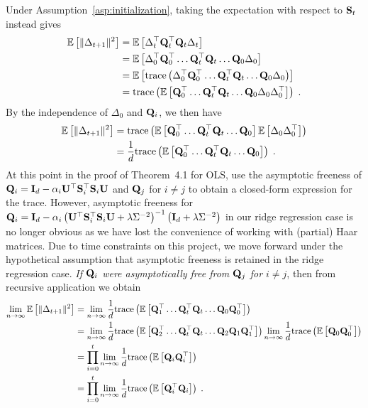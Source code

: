 Under Assumption~\ref{asp:initialization}, taking the expectation with respect to $\mathbf{S}_t$ instead gives
\begin{align*}
\mathbb{E}\left[\|\Delta_{t+1}\|^2\right] &= \mathbb{E}\left[\Delta_t^\top\mathbf{Q}_t^\top\mathbf{Q}_t\Delta_t\right] \\
&= \mathbb{E}\left[\Delta_0^\top\mathbf{Q}_0^\top\ldots \mathbf{Q}_t^\top\mathbf{Q}_t\ldots\mathbf{Q}_0\Delta_0\right] \\
&= \mathbb{E}\left[\mathrm{trace}\left(\Delta_0^\top\mathbf{Q}_0^\top\ldots \mathbf{Q}_t^\top\mathbf{Q}_t\ldots\mathbf{Q}_0\Delta_0\right)\right] \\
&= \mathrm{trace}\left(\mathbb{E}\left[\mathbf{Q}_0^\top\ldots \mathbf{Q}_t^\top\mathbf{Q}_t\ldots\mathbf{Q}_0\Delta_0\Delta_0^\top\right]\right) \;.
\end{align*}
By the independence of $\Delta_0$ and $\mathbf{Q}_i$, we then have
\begin{align*}
\mathbb{E}\left[\|\Delta_{t+1}\|^2\right] &= \mathrm{trace}\left(\mathbb{E}\left[\mathbf{Q}_0^\top\ldots \mathbf{Q}_t^\top\mathbf{Q}_t\ldots\mathbf{Q}_0\right]\mathbb{E}\left[\Delta_0\Delta_0^\top\right]\right) \\
&= \frac{1}{d}\mathrm{trace}\left(\mathbb{E}\left[\mathbf{Q}_0^\top\ldots \mathbf{Q}_t^\top\mathbf{Q}_t\ldots\mathbf{Q}_0\right]\right) \;.
\end{align*}
At this point in the proof of Theorem~4.1 for OLS, \citet{Lacotte:2020} use the asymptotic freeness of $\mathbf{Q}_i=\mathbf{I}_d-\alpha_i\mathbf{U}^\top\mathbf{S}_i^\top\mathbf{S}_i\mathbf{U}$ and $\mathbf{Q}_j$ for $i\neq j$ to obtain a closed-form expression for the trace. However, asymptotic freeness for $\mathbf{Q}_i=\mathbf{I}_d - \alpha_i\left(\mathbf{U}^\top\mathbf{S}_i^\top\mathbf{S}_i\mathbf{U} + \lambda\Sigma^{-2}\right)^{-1}\left(\mathbf{I}_d + \lambda\Sigma^{-2}\right)$ in our ridge regression case is no longer obvious as we have lost the convenience of working with (partial) Haar matrices. Due to time constraints on this project, we move forward under the hypothetical assumption that asymptotic freeness is retained in the ridge regression case. \textit{If $\mathbf{Q}_i$ were asymptotically free from $\mathbf{Q}_j$ for $i\neq j$}, then from recursive application we obtain
\begin{align*}
\lim_{n\rightarrow\infty}\mathbb{E}\left[\|\Delta_{t+1}\|^2\right] &= \lim_{n\rightarrow\infty}\frac{1}{d}\mathrm{trace}\left(\mathbb{E}\left[\mathbf{Q}_1^\top\ldots \mathbf{Q}_t^\top\mathbf{Q}_t\ldots\mathbf{Q}_0\mathbf{Q}_0^\top\right]\right) \\
&= \lim_{n\rightarrow\infty}\frac{1}{d}\mathrm{trace}\left(\mathbb{E}\left[\mathbf{Q}_2^\top\ldots \mathbf{Q}_t^\top\mathbf{Q}_t\ldots\mathbf{Q}_2\mathbf{Q}_1\mathbf{Q}_1^\top\right]\right)\lim_{n\rightarrow\infty}\frac{1}{d}\mathrm{trace}\left(\mathbb{E}\left[\mathbf{Q}_0\mathbf{Q}_0^\top\right]\right) \\
&= \prod_{i=0}^t\lim_{n\rightarrow\infty}\frac{1}{d}\mathrm{trace}\left(\mathbb{E}\left[\mathbf{Q}_i\mathbf{Q}_i^\top\right]\right) \\
&= \prod_{i=0}^t\lim_{n\rightarrow\infty}\frac{1}{d}\mathrm{trace}\left(\mathbb{E}\left[\mathbf{Q}_i^\top\mathbf{Q}_i\right]\right) \;.
\end{align*}
